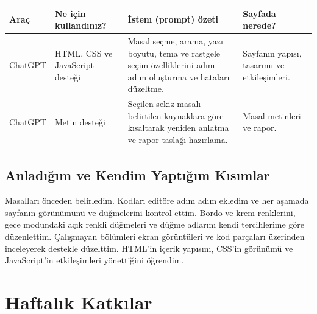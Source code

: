 \documentclass[12pt,a4paper]{article}
\begin{document}
\begin{longtable}{@{}p{2.6cm}p{3.6cm}p{4.2cm}p{3.4cm}@{}}
\toprule
\textbf{Araç} & \textbf{Ne için kullandınız?} & \textbf{İstem (prompt) özeti} & \textbf{Sayfada nerede?} \\
\midrule
\endhead
ChatGPT & HTML, CSS ve JavaScript desteği & Masal seçme, arama, yazı boyutu, tema ve rastgele seçim özelliklerini adım adım oluşturma ve hataları düzeltme. & Sayfanın yapısı, tasarımı ve etkileşimleri. \tabularnewline
ChatGPT & Metin desteği & Seçilen sekiz masalı belirtilen kaynaklara göre kısaltarak yeniden anlatma ve rapor taslağı hazırlama. & Masal metinleri ve rapor. \tabularnewline
\bottomrule
\end{longtable}

\subsection{Anladığım ve Kendim Yaptığım Kısımlar}
Masalları önceden belirledim. Kodları editöre adım adım ekledim ve her aşamada sayfanın görünümünü ve düğmelerini kontrol ettim. Bordo ve krem renklerini, gece modundaki açık renkli düğmeleri ve düğme adlarını kendi tercihlerime göre düzenlettim. Çalışmayan bölümleri ekran görüntüleri ve kod parçaları üzerinden inceleyerek destekle düzelttim. HTML’in içerik yapısını, CSS’in görünümü ve JavaScript’in etkileşimleri yönettiğini öğrendim.

\section{Haftalık Katkılar}
\end{document}

